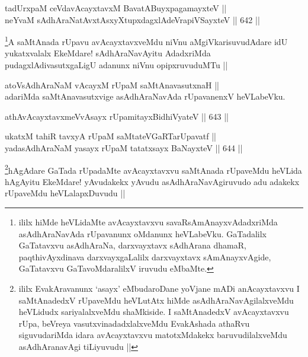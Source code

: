 
\begin{shl}
tadUrxpaM ceVdavAcayxtavxM BavatA\s BuyxpagamayxteV || \\
neYvaM sAdhAraNatAvxtAsxyXtupxdagxlAdeVrapiVSayxteV ||  642 ||  
\end{shl}

\begin{artha}
\footnote{ililx hiMde heVLidaMte avAcayxtavxvu savaRsAmAnayxvAdadxriMda asAdhAraNavAda rUpavanunx oMdanunx heVLabeVku. GaTadalilx GaTatavxvu asAdhAraNa, darxvayxtavx sAdhArana dhamaR, paqthivAyxdinava darxvayxgaLalilx darxvayxtavx sAmAnayxvAgide, GaTatavxvu GaTavoMdaralilxV iruvudu eMbaMte.}A saMtAnada rUpavu avAcayxtavxveMdu niVnu aMgiVkarisuvudAdare idU yukatxvalalx EkeMdare! sAdhAraNavAyitu AdadxriMda pudagxlAdivasutxgaLigU adanunx niVnu opipxruvuduMTu ||

atoV\s sAdhAraNaM vAcayxM rUpaM saMtAnavasutxnaH || \\

adariMda saMtAnavasutxvige asAdhAraNavAda rUpavanenxV heVLabeVku.
\end{artha}


\begin{shl}
athAvAcayxtavxmeVvAsayx rUpamitayxBidhiVyateV ||  643 ||  
\end{shl}

\begin{shl}
ukatxM tahiR tavxyA rUpaM saMtateVGaRTarUpavatf ||  \\
yadasAdhAraNaM yasayx rUpaM tatatxsayx BaNayxteV ||  644 ||  
\end{shl}

\begin{artha}
\footnote{ililx EvakAravanunx `asayx' eMbudaroDane yoVjane mADi anAcayxtavxvu I saMtAnadedxV rUpaveMdu heVLutAtx hiMde asAdhAraNavAgilalxveMdu heVLidudx sariyalalxveMdu shaMkiside. I saMtAnadedxV avAcayxtavxvu rUpa, beVreya vasutxvinadadxlalxveMdu EvakAshada athaRvu siguvudariMda idara avAcayxtavxvu matotxMdakekx baruvudilalxveMdu asAdhAranavAgi tiLiyuvudu ||}hAgAdare GaTada rUpadaMte avAcayxtavxvu saMtAnada rUpaveMdu heVLida hAgAyitu EkeMdare! yAvudakekx yAvudu asAdhAraNavAgiruvudo adu adakekx rUpaveMdu heVLalapxDuvudu ||
\end{artha}


